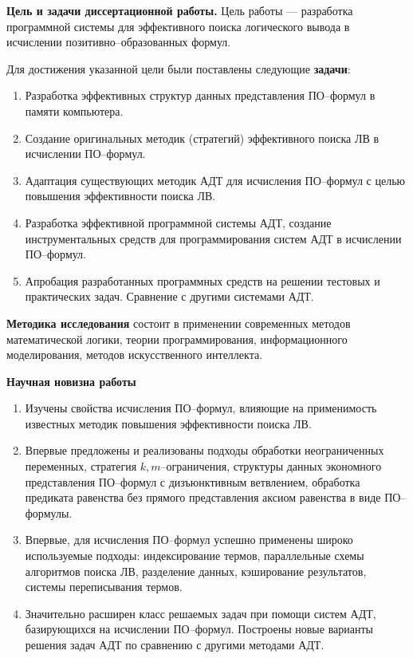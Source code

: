 \documentclass[a4paper]{report}
\begin{document}
\textbf{Цель и задачи диссертационной работы.}
Цель работы --- разработка программной системы для эффективного поиска логического вывода в исчислении позитивно--образованных формул.

Для достижения указанной цели были поставлены следующие \textbf{задачи}:
\begin{enumerate}
\item Разработка эффективных структур данных представления ПО--формул в памяти компьютера.
\item Создание оригинальных методик (стратегий) эффективного поиска ЛВ в исчислении ПО--формул.
\item Адаптация существующих методик АДТ для исчисления ПО--формул с целью повышения эффективности поиска ЛВ.
\item Разработка эффективной программной системы АДТ, создание инструментальных средств для программирования систем АДТ в исчислении ПО--формул.
\item Апробация разработанных программных средств на решении тестовых и практических задач. Сравнение с другими системами АДТ.
\end{enumerate}

\textbf{Методика исследования} состоит в применении современных методов математической логики, теории программирования, информационного моделирования, методов искусственного интеллекта.

\textbf{Научная новизна работы}
\begin{enumerate}
\item Изучены свойства исчисления ПО--формул, влияющие на применимость известных методик повышения эффективности поиска ЛВ.
\item Впервые предложены и реализованы подходы обработки неограниченных переменных, стратегия $k,m$--ограничения, структуры данных экономного представления ПО--формул с дизъюнктивным ветвлением, обработка предиката равенства без прямого представления аксиом равенства в виде ПО--формулы.
\item Впервые, для исчисления ПО--формул успешно применены широко используемые подходы: индексирование термов, параллельные схемы алгоритмов поиска ЛВ, разделение данных, кэширование результатов, системы переписывания термов.
\item Значительно расширен класс решаемых задач при помощи систем АДТ, базирующихся на исчислении ПО--формул. Построены новые варианты решения задач АДТ по сравнению с другими методами АДТ.
\end{enumerate}
\end{document}
